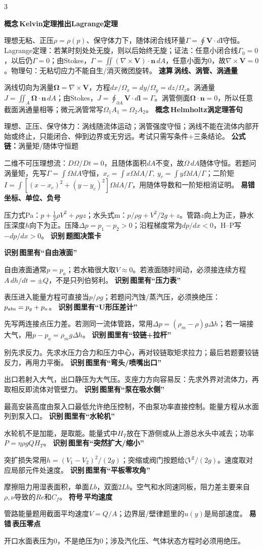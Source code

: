 \documentclass[a4paper]{article}
\newcommand{\form}[1]{{\color{M}\bfseries 公式链：}#1\par}
\newcommand{\labtag}[3]{{\bfseries\color{#1}\colorbox{#1}{\color{white}\fontsize{2.35}{2.48}\selectfont #2}\,#3}\par}
\newcommand{\iden}[1]{\labtag{C}{识别}{#1}}
\newcommand{\err}[1]{\labtag{R}{易错}{#1}}
\newcommand{\concept}[1]{\labtag{V}{概念}{#1}}
\newcommand{\sym}[1]{\labtag{F}{符号}{#1}}
\newcommand{\idq}[1]{\iden{#1}}
\newcommand{\formq}[1]{\form{#1}}
\newcommand{\errq}[1]{\err{#1}}
\newcommand{\conceptq}[1]{\concept{#1}}
\newcommand{\symq}[1]{\sym{#1}}
\newcommand{\quickq}[1]{\labtag{F}{速算}{#1}}
\newenvironment{vfourWrap}{\par\begingroup\fontsize{2.68}{2.84}\selectfont\setlength{\fboxsep}{0.45pt}}{\par\endgroup}
\begin{document}
\begin{multicols}{3}
\begin{vfourWrap}
\conceptq{Kelvin定理推出Lagrange定理}
理想无粘、正压$\rho=\rho(p)$、保守体力下，随体闭合线环量$\Gamma=\oint\bm V\cdot d\bm l$守恒。Lagrange定理：若某时刻处处无旋，则以后始终无旋；证法：任意小闭合线$\Gamma_0=0$，以后仍$\Gamma=0$；由Stokes，$\Gamma=\iint(\nabla\times\bm V)\cdot\bm n\,dA$，任意小面为0，故$\nabla\times\bm V=0$。物理句：无粘切应力不能自生/消灭微团旋转。
\quickq{涡线、涡管、涡通量}
涡线切向为涡量$\bm\Omega=\nabla\times\bm V$，方程$dx/\Omega_x=dy/\Omega_y=dz/\Omega_z$。涡通量$J=\iint_A\bm\Omega\cdot\bm n\,dA$；由Stokes，$J=\oint_{\partial A}\bm V\cdot d\bm l=\Gamma$。涡管侧面$\bm\Omega\cdot\bm n=0$，所以任意截面涡通量相等；微元涡管常写$\Omega_1A_1=\Omega_2A_2$。
\conceptq{Helmholtz涡定理答句}
理想、正压、保守体力：涡线随流体运动；涡管强度守恒；涡线不能在流体内部开始或终止，只能闭合、伸到边界或无穷远。考试只需写条件+三条结论。
\formq{涡量矩/随体守恒题}
二维不可压理想流：$D\Omega/Dt=0$，且随体面积$dA$不变，故$\Omega\,dA$随体守恒。若题问涡量矩，先写$\Gamma=\int\Omega dA$守恒，$x_c=\int x\Omega dA/\Gamma,\ y_c=\int y\Omega dA/\Gamma$；二阶矩$I=\int[(x-x_c)^2+(y-y_c)^2]\Omega dA/\Gamma$，用随体导数和一阶矩相消证明。
\errq{坐标、单位、负号}
压力式Pa：$p+\frac12\rho V^2+\rho gz$；水头式m：$p/\rho g+V^2/2g+z$。管路$z$向上为正，静水压深度$h$向下为正。压降$\Delta p=p_1-p_2>0$；沿程梯度常为$dp/dx<0$，H--P写$-dp/dx>0$。
\idq{题图决策卡}
\idq{图里有“自由液面”}
自由液面通常$p=p_a$；若水箱很大取$V\approx0$。若液面随时间动，必须接连续方程$A\,dh/dt=\pm Q$，不是只列伯努利。
\idq{图里有“压力表”}
表压进入能量方程可直接当$p/\rho g$；若题问汽蚀/蒸汽压，必须换绝压：$p_{\rm abs}=p_g+p_a$。
\idq{图里有“U形压差计”}
先写两连接点压力差。若测同一流体管路，常用$\Delta p=(\rho_m-\rho)g\Delta h$；若一端接大气，用$p-p_a=\rho_m g\Delta h$。
\idq{图里有“铰链+拉杆”}
别先求反力。先求水压力合力和压力中心，再对铰链取矩求拉力；最后若题要铰链反力，再用力平衡。
\idq{图里有“弯头/喷嘴出口”}
出口若射入大气，出口静压为大气压。支座力方向容易反：先求外界对流体力，再取相反即流体对管壁力。
\idq{图里有“泵在吸水侧”}
最高安装高度由泵入口最低允许绝压控制，不由泵功率直接控制。能量方程从水面列到泵入口。
\idq{图里有“水轮机”}
水轮机不是加能，是取能。能量式中$H_T$放在下游侧或从上游总水头中减去；功率$P=\eta\rho gQH_T$。
\idq{图里有“突然扩大/缩小”}
突扩损失常用$h=(V_1-V_2)^2/(2g)$；突缩或阀门按题给$\zeta V^2/(2g)$。速度取对应局部元件处速度。
\idq{图里有“平板零攻角”}
摩擦阻力用湿表面积，单面$Lb$，双面$2Lb$。空气和水同速同板，阻力差主要来自$\rho,\nu$导致的$Re$和$C_f$。
\symq{平均速度}
管路能量题用截面平均速度$V=Q/A$；边界层/壁律题里的$u(y)$是局部速度。
\errq{表压零点}
开口水面表压为0，不是绝压为0；涉及汽化压、气体状态方程时必须用绝压。

\end{vfourWrap}
\end{multicols}
\end{document}
